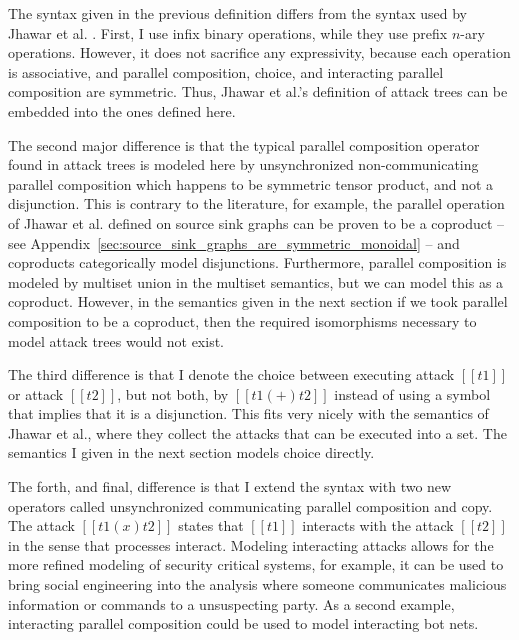 \documentclass{llncs}
\begin{document}
The syntax given in the previous definition differs from the syntax
used by Jhawar et al. \cite{Jhawar:2015}.  First, I use infix binary
operations, while they use prefix $n$-ary operations. However, it does
not sacrifice any expressivity, because each operation is associative,
and parallel composition, choice, and interacting parallel composition
are symmetric.  Thus, Jhawar et al.'s definition of attack trees can
be embedded into the ones defined here.%

The second major difference is that the typical parallel composition
operator found in attack trees is modeled here by unsynchronized
non-communicating parallel composition which happens to be symmetric
tensor product, and not a disjunction.  This is contrary to the
literature, for example, the parallel operation of Jhawar et
al. defined on source sink graphs \cite{Jhawar:2015} can be proven to
be a coproduct -- see
Appendix~\ref{sec:source_sink_graphs_are_symmetric_monoidal} -- and
coproducts categorically model disjunctions.  Furthermore, parallel
composition is modeled by multiset union in the multiset semantics,
but we can model this as a coproduct.  However, in the semantics given
in the next section if we took parallel composition to be a coproduct,
then the required isomorphisms necessary to model attack trees would
not exist.

The third difference is that I denote the choice between executing
attack $[[t1]]$ or attack $[[t2]]$, but not both, by $[[t1 (+) t2]]$
instead of using a symbol that implies that it is a disjunction.  This
fits very nicely with the semantics of Jhawar et al., where they
collect the attacks that can be executed into a set.  The semantics I
given in the next section models choice directly.

The forth, and final, difference is that I extend the syntax with two
new operators called unsynchronized communicating parallel composition
and copy.  The attack $[[t1 (x) t2]]$ states that $[[t1]]$ interacts
with the attack $[[t2]]$ in the sense that processes interact.
Modeling interacting attacks allows for the more refined modeling of
security critical systems, for example, it can be used to bring social
engineering into the analysis where someone communicates malicious
information or commands to a unsuspecting party.  As a second example,
interacting parallel composition could be used to model interacting
bot nets.
\end{document}
